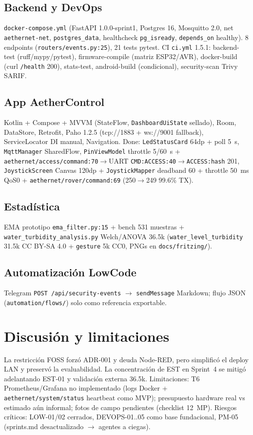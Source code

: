\documentclass[conference]{IEEEtran}
\begin{document}
\subsection{Backend y DevOps}
\texttt{docker-compose.yml} (FastAPI 1.0.0-sprint1, Postgres 16, Mosquitto 2.0, net \texttt{aethernet-net}, \texttt{postgres\_data}, healthcheck \texttt{pg\_isready}, \texttt{depends\_on} healthy). 8 endpoints (\texttt{routers/events.py:25}), 21 tests pytest. CI \texttt{ci.yml} 1.5.1: backend-test (ruff/mypy/pytest), firmware-compile (matriz ESP32/AVR), docker-build (curl \texttt{/health} 200), stats-test, android-build (condicional), security-scan Trivy SARIF.

\subsection{App AetherControl}
Kotlin + Compose + MVVM (StateFlow, \texttt{DashboardUiState} sellado), Room, DataStore, Retrofit, Paho 1.2.5 (tcp://1883 + ws://9001 fallback), ServiceLocator DI manual, Navigation. Done: \texttt{LedStatusCard} 64dp + poll 5~s, \texttt{MqttManager} SharedFlow, \texttt{PinViewModel} throttle 5/60~s + \texttt{aethernet/access/command:70}$\rightarrow$UART \texttt{CMD:ACCESS:40}$\rightarrow$\texttt{ACCESS:hash} 201, \texttt{JoystickScreen} Canvas 120dp + \texttt{JoystickMapper} deadband 60 + throttle 50~ms QoS0 + \texttt{aethernet/rover/command:69} (250$\rightarrow$249 99.6\% TX).

\subsection{Estadística}
EMA prototipo \texttt{ema\_filter.py:15} + bench 531 muestras + \texttt{water\_turbidity\_analysis.py} Welch/ANOVA 36.5k (\texttt{water\_level\_turbidity} 31.5k CC BY-SA 4.0 + \texttt{gesture} 5k CC0, PNGs en \texttt{docs/fritzing/}).

\subsection{Automatización LowCode}
Telegram \texttt{POST /api/security-events} $\rightarrow$ \texttt{sendMessage} Markdown; flujo JSON (\texttt{automation/flows/}) solo como referencia exportable.

\section{Discusión y limitaciones}
La restricción FOSS forzó ADR-001 y deuda Node-RED, pero simplificó el deploy LAN y preservó la evaluabilidad. La concentración de EST en Sprint~4 se mitigó adelantando EST-01 y validación externa 36.5k. Limitaciones: T6 Prometheus/Grafana no implementado (logs Docker + \texttt{aethernet/system/status} heartbeat como MVP); presupuesto hardware real vs estimado aún informal; fotos de campo pendientes (checklist 12~MP). Riesgos críticos: LOW-01/02 cerrados, DEVOPS-01..05 como base fundacional, PM-05 (sprints.md desactualizado $\rightarrow$ agentes a ciegas).
\end{document}
